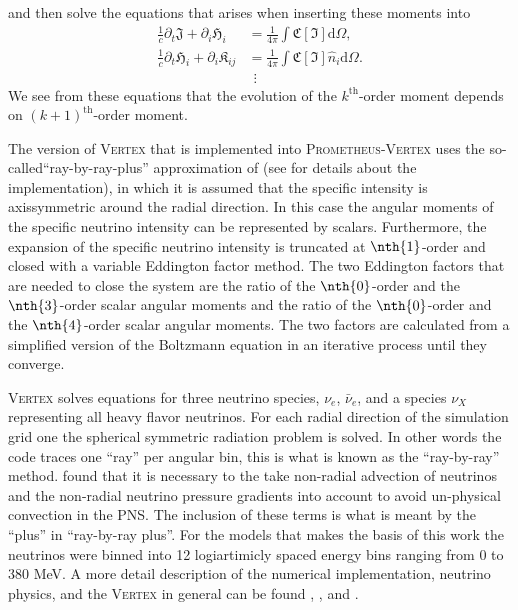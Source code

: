 and then solve the equations that arises when inserting these moments into 
\begin{align}
\frac{1}{c} \partial_t \mathfrak{J} +  \partial_i \mathfrak{H}_i &= \frac{1}{4\pi} \int \mathfrak{C} [\mathfrak{I}] \mathrm{d} \Omega, \\
\frac{1}{c} \partial_t \mathfrak{H}_i + \partial_i \mathfrak{K}_{ij} &= \frac{1}{4\pi} \int \mathfrak{C} [\mathfrak{I}] \hat{n}_i \mathrm{d} \Omega. \\
& \ \ \vdots \nonumber
\end{align}
We see from these equations that the evolution of the $k^{\text{th}}$-order moment depends on $(k+1)^{\text{th}}$-order moment.

The version of \textsc{Vertex} that is implemented into \textsc{Prometheus-Vertex} uses
the so-called``ray-by-ray-plus'' approximation of \cite{buras_06a} (see \cite{hanke_phd} for details about the implementation),
in which it is assumed that the specific intensity is axissymmetric around the radial direction. 
In this case the angular moments of the specific neutrino intensity can be represented by scalars.
Furthermore, the expansion of the specific neutrino intensity is truncated at $\nth{1}$-order and
closed with a variable Eddington factor method. The two Eddington factors that are needed to close the system are the ratio of
the $\nth{0}$-order and the $\nth{3}$-order scalar angular moments and the ratio of the $\nth{0}$-order and the $\nth{4}$-order scalar angular moments.
The two factors are calculated from a simplified version of the Boltzmann equation in an iterative 
process until they converge. 

\textsc{Vertex} solves equations for three neutrino species, $\nu_e$, $\bar{\nu}_e$, and a species $\nu_X$ representing
all heavy flavor neutrinos. For each radial direction of the simulation grid one the spherical symmetric radiation problem is solved.
In other words the code traces one ``ray'' per angular bin, this is what is known as the ``ray-by-ray'' method. \cite{buras_06b} 
found that it is necessary to the take non-radial advection of neutrinos and the non-radial neutrino pressure gradients into account to avoid 
un-physical convection in the PNS. The inclusion of these terms is what is meant by the ``plus'' in ``ray-by-ray plus''.
For the models that makes the basis of this work the neutrinos were binned into 12 logiartimicly spaced energy bins ranging from 0 to 380 MeV.  
A more detail description of the numerical implementation, neutrino physics, and the \textsc{Vertex} in general can
be found \cite{rampp_02}, \cite{hanke_phd}, and \cite{melson_phd}.
